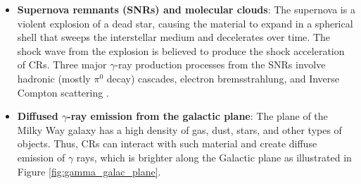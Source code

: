 \begin{itemize}
    \item \textbf{Supernova remnants (SNRs) and molecular clouds}: 
    The supernova is a violent explosion of a dead star,
    causing the material to expand in a spherical shell that sweeps
    the interstellar medium and decelerates over time.
    The shock wave from the explosion is believed to produce the
    shock acceleration of CRs.
    Three major $\gamma$-ray production processes from the SNRs
    involve hadronic (mostly $\pi^0$ decay) cascades, electron
    bremsstrahlung, and Inverse Compton scattering
    \citep{cr_from_snr_2013}.

    \item \textbf{Diffused $\gamma$-ray emission from the galactic plane}:
    The plane of the Milky Way galaxy has a high density of gas,
    dust, stars, and other types of objects.
    Thus, CRs can interact with such material and create diffuse
    emission of $\gamma$ rays, which is brighter along the
    Galactic plane as illustrated in Figure \ref{fig:gamma_galac_plane}.


\end{itemize}
